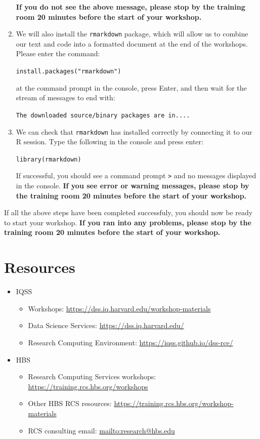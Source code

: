 \documentclass[
]{book}
\providecommand{\tightlist}{%
  \setlength{\itemsep}{0pt}\setlength{\parskip}{0pt}}
\begin{document}
\begin{enumerate}
  \textbf{If you do not see the above message, please stop by the training room 20 minutes before the start of your workshop.}
\item
  We will also install the \texttt{rmarkdown} package, which will allow us to
  combine our text and code into a formatted document at the end of
  the workshops. Please enter the command:

  \texttt{install.packages("rmarkdown")}

  at the command prompt in the console, press Enter, and then wait for the
  stream of messages to end with:

  \texttt{The\ downloaded\ source/binary\ packages\ are\ in....}
\item
  We can check that \texttt{rmarkdown} has installed correctly by connecting it to our R session.
  Type the following in the console and press enter:

  \texttt{library(rmarkdown)}

  If successful, you should see a command prompt \texttt{\textgreater{}} and no messages displayed in the console.
  \textbf{If you see error or warning messages, please stop by the training room 20 minutes before the start of your workshop.}
\end{enumerate}

If all the above steps have been completed successfuly, you should now
be ready to start your workshop. \textbf{If you ran into any problems, please
stop by the training room 20 minutes before the start of your workshop.}

\hypertarget{resources-1}{%
\section{Resources}\label{resources-1}}

\begin{itemize}
\tightlist
\item
  IQSS

  \begin{itemize}
  \tightlist
  \item
    Workshops: \url{https://dss.iq.harvard.edu/workshop-materials}
  \item
    Data Science Services: \url{https://dss.iq.harvard.edu/}
  \item
    Research Computing Environment: \url{https://iqss.github.io/dss-rce/}
  \end{itemize}
\item
  HBS

  \begin{itemize}
  \tightlist
  \item
    Research Computing Services workshops: \url{https://training.rcs.hbs.org/workshops}
  \item
    Other HBS RCS resources: \url{https://training.rcs.hbs.org/workshop-materials}
  \item
    RCS consulting email: \url{mailto:research@hbs.edu}
  \end{itemize}
\end{itemize}
\end{document}
